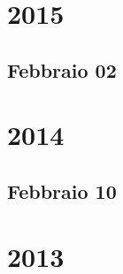 \documentclass[12pt,a4paper,draft]{report}
\begin{document}
 

\maketitle
\tableofcontents
 
\chapter{2015}
\section{Febbraio 02}
%








\chapter{2014}
\section{Febbraio 10}










\chapter{2013}



 
\end{document}
